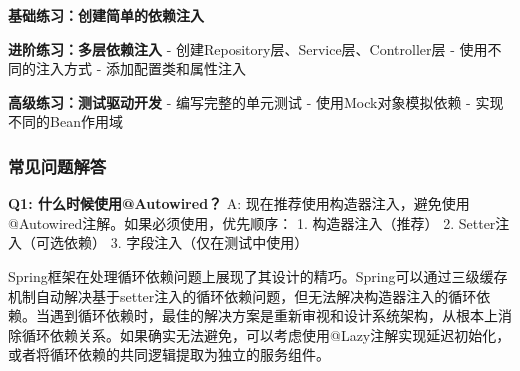 \textbf{基础练习：创建简单的依赖注入}

\begin{Shaded}
\begin{Highlighting}[]
 \OperatorTok{\{}
      \OperatorTok{(}\OperatorTok{,} \OperatorTok{)} \OperatorTok{\{}
        \OperatorTok{+}\OperatorTok{;}
    \OperatorTok{\}}
\OperatorTok{\}}

 \OperatorTok{\{}
     \OperatorTok{;}
    
     \OperatorTok{(}\OperatorTok{)} \OperatorTok{\{}
         \OperatorTok{=}\OperatorTok{;}
    \OperatorTok{\}}
\OperatorTok{\}}
\end{Highlighting}
\end{Shaded}

\textbf{进阶练习：多层依赖注入} - 创建Repository层、Service层、Controller层 - 使用不同的注入方式 - 添加配置类和属性注入

\textbf{高级练习：测试驱动开发} - 编写完整的单元测试 - 使用Mock对象模拟依赖 - 实现不同的Bean作用域

\subsubsection{常见问题解答}\label{ux5e38ux89c1ux95eeux9898ux89e3ux7b54}

\textbf{Q1: 什么时候使用@Autowired？} A: 现在推荐使用构造器注入，避免使用@Autowired注解。如果必须使用，优先顺序： 1. 构造器注入（推荐） 2. Setter注入（可选依赖） 3. 字段注入（仅在测试中使用）

Spring框架在处理循环依赖问题上展现了其设计的精巧。Spring可以通过三级缓存机制自动解决基于setter注入的循环依赖问题，但无法解决构造器注入的循环依赖。当遇到循环依赖时，最佳的解决方案是重新审视和设计系统架构，从根本上消除循环依赖关系。如果确实无法避免，可以考虑使用@Lazy注解实现延迟初始化，或者将循环依赖的共同逻辑提取为独立的服务组件。

